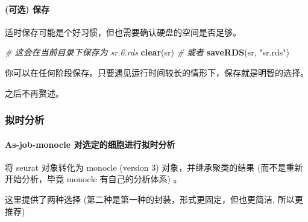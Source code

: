 \documentclass[
]{article}
\newenvironment{Shaded}{\begin{snugshade}}{\end{snugshade}}
\newcommand{\CommentTok}[1]{\textcolor[rgb]{0.56,0.35,0.01}{\textit{#1}}}
\newcommand{\KeywordTok}[1]{\textcolor[rgb]{0.13,0.29,0.53}{\textbf{#1}}}
\newcommand{\NormalTok}[1]{#1}
\newcommand{\StringTok}[1]{\textcolor[rgb]{0.31,0.60,0.02}{#1}}
\begin{document}
\hypertarget{ux53efux9009-ux4fddux5b58}{%
\paragraph{(可选) 保存}\label{ux53efux9009-ux4fddux5b58}}

适时保存可能是个好习惯，但也需要确认硬盘的空间是否足够。

\begin{Shaded}
\begin{Highlighting}[]
\CommentTok{\# 这会在当前目录下保存为 \textquotesingle{}sr.6.rds\textquotesingle{}}
\KeywordTok{clear}\NormalTok{(sr)}
\CommentTok{\# 或者}
\KeywordTok{saveRDS}\NormalTok{(sr, }\StringTok{"sr.rds"}\NormalTok{)}
\end{Highlighting}
\end{Shaded}

你可以在任何阶段保存。只要遇见运行时间较长的情形下，保存就是明智的选择。

之后不再赘述。

\hypertarget{ux62dfux65f6ux5206ux6790}{%
\subsubsection{拟时分析}\label{ux62dfux65f6ux5206ux6790}}

\hypertarget{as-job-monocle-ux5bf9ux9009ux5b9aux7684ux7ec6ux80deux8fdbux884cux62dfux65f6ux5206ux6790}{%
\paragraph{As-job-monocle 对选定的细胞进行拟时分析}\label{as-job-monocle-ux5bf9ux9009ux5b9aux7684ux7ec6ux80deux8fdbux884cux62dfux65f6ux5206ux6790}}

将 seurat 对象转化为 monocle (version 3) 对象，并继承聚类的结果 (而不是重新开始分析，毕竟 monocle 有自己的分析体系) 。

这里提供了两种选择 (第二种是第一种的封装，形式更固定，但也更简洁, 所以更推荐)
\end{document}
